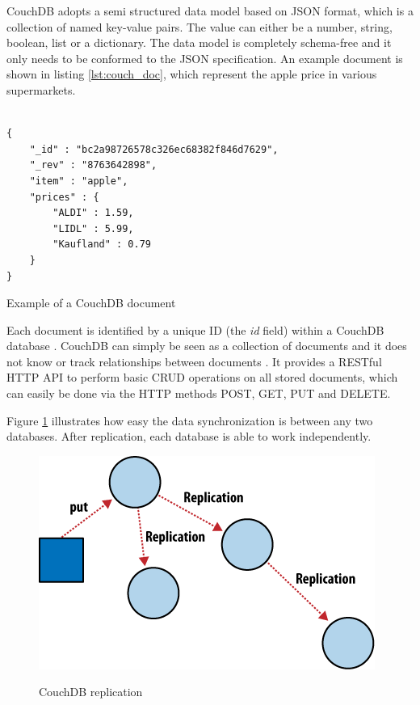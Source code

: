 CouchDB adopts a semi structured data model based on \ac{JSON} format, which is a collection of named key-value pairs. The value can either be a number, string, boolean, list or a dictionary. The data model is completely schema-free and it only needs to be conformed to the \ac{JSON} specification. An example document is shown in listing \ref{lst:couch_doc}, which represent the apple price in various supermarkets. 
\\
\\
\begin{code}
\begin{verbatim}
{
    "_id" : "bc2a98726578c326ec68382f846d7629",
    "_rev" : "8763642898",
    "item" : "apple",
    "prices" : {
        "ALDI" : 1.59,
        "LIDL" : 5.99,
        "Kaufland" : 0.79
    }
}
\end{verbatim}
\caption{Example of a CouchDB document}
\label{lst:couch_doc}
\end{code}

Each document is identified by a unique ID (the \textit{id} field) within a CouchDB database . CouchDB can simply be seen as a collection of documents and it does not know or track relationships between documents \cite{books:daglib:0024051}.  It provides a RESTful \ac{HTTP} \ac{API} to perform basic CRUD operations on all stored documents, which can easily be done via the \ac{HTTP} methods POST, GET, PUT and DELETE.

Figure \ref{fig:couchdb_repl} illustrates how easy the data synchronization is between any two databases. After replication, each database is able to work independently.

\begin{figure}[htb]
  \centering
  \includegraphics{couchdb_repl.png}\\
  \caption{CouchDB replication}
  \label{fig:couchdb_repl}
  \protect\cite{couchdb_cons}
\end{figure}

